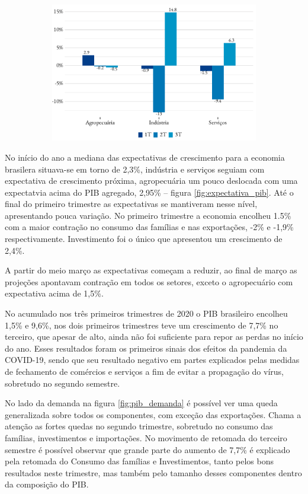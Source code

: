 \begin{figure}[!h]
\begin{subfigure}{\linewidth}
		\includegraphics{fig/pib_oferta.pdf}
	\end{subfigure}
\end{figure}
\par No início do ano a mediana das expectativas de crescimento para a economia brasilera situava-se em torno de 2,3\%, indústria e serviços seguiam com expectativa de crescimento próxima, agropecuária um pouco deslocada com uma expectatvia acima do PIB agregado, 2,95\% -- figura \ref{fig:expectativa_pib}. Até o final do primeiro trimestre as expectativas se mantiveram nesse nível, apresentando pouca variação. No primeiro trimestre a economia encolheu 1.5\% com a maior contração no consumo das famílias e nas exportações, -2\% e -1,9\% respectivamente. Investimento foi o único que apresentou um crescimento de 2,4\%.
\par A partir do meio março as expectativas começam a reduzir, ao final de março as projeções apontavam contração em todos os setores, exceto o agropecuário com expectativa acima de 1,5\%.
\par No acumulado nos três primeiros trimestres de 2020 o PIB brasileiro encolheu 1,5\% e 9,6\%, nos dois primeiros trimestres teve um crescimento de 7,7\% no terceiro, que apesar de alto, ainda não foi suficiente para repor as perdas no início do ano. Esses resultados foram os primeiros sinais dos efeitos da pandemia da COVID-19, sendo que seu resultado negativo em partes explicados pelas medidas de fechamento de comércios e serviços a fim de evitar a propagação do vírus, sobretudo no segundo semestre.
\par No lado da demanda na figura \ref{fig:pib_demanda} é possível ver uma queda generalizada sobre todos os componentes, com exceção das exportações. Chama a atenção as fortes quedas no segundo trimestre, sobretudo no consumo das famílias, investimentos e importações. No movimento de retomada do terceiro semestre é possível observar que grande parte do aumento de 7,7\% é explicado pela retomada do Consumo das famílias e Investimentos, tanto pelos bons resultados neste trimestre, mas também pelo tamanho desses componentes dentro da composição do PIB.
